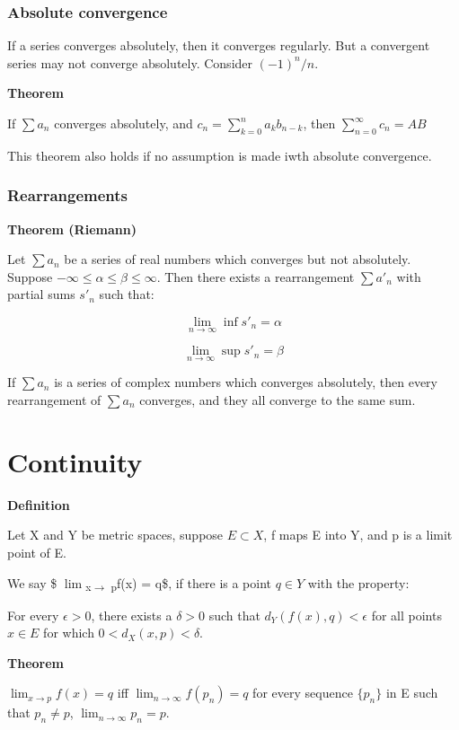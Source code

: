 \documentclass[11pt]{article}
\begin{document}
\subsubsection{Absolute convergence}
\label{sec:orgdfd3c7d}

If a series converges absolutely, then it converges regularly. But a convergent series may not converge absolutely. Consider \((-1)^n / n\).

\textbf{Theorem}

If \(\sum a_n\) converges absolutely, and \(c_n = \sum_{k=0}^n a_k b_{n-k}\), then \(\sum_{n=0}^\infty c_n = AB\)

This theorem also holds if no assumption is made iwth absolute convergence.

\subsubsection{Rearrangements}
\label{sec:org718e8a0}

\textbf{Theorem (Riemann)}

Let \(\sum a_n\) be a series of real numbers which converges but not absolutely. Suppose \(-\infty \leq \alpha \leq \beta \leq \infty\). Then there exists a rearrangement \(\sum a'_n\) with partial sums \(s'_n\) such that:

\[
\lim_{n\to\infty}\inf s'_n = \alpha
\]

\[
\lim_{n\to\infty}\sup s'_n = \beta
\]

If \(\sum a_n\) is a series of complex numbers which converges absolutely, then every rearrangement of \(\sum a_n\) converges, and they all converge to the same sum.

\section{Continuity}
\label{sec:orgb411e51}

\textbf{Definition}

Let X and Y be metric spaces, suppose \(E \subset X\), f maps E into Y, and p is a limit point of E.

We say \$ \(\lim\)\textsubscript{x\(\to\) p}f(x) = q\$, if there is a point \(q \in Y\) with the property:

For every \(\epsilon > 0\), there exists a \(\delta > 0\) such that \(d_Y(f(x),q) < \epsilon\) for all points \(x\in E\) for which \(0 < d_X(x,p) < \delta\).

\textbf{Theorem}

\(\lim_{x \to p} f(x) = q\) iff \(\lim_{n \to \infty} f(p_n) = q\) for every sequence \(\{p_n\}\) in E such that \(p_n \neq p\), \(\lim_{n \to \infty} p_n = p\).
\end{document}
